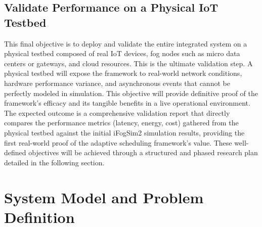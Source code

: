 \documentclass[conference]{IEEEtran}
\begin{document}
	
	\subsection{Validate Performance on a Physical IoT Testbed}
	This final objective is to deploy and validate the entire integrated system on a physical testbed composed of real IoT devices, fog nodes such as micro data centers or gateways, and cloud resources.
	This is the ultimate validation step. A physical testbed will expose the framework to real-world network conditions, hardware performance variance, and asynchronous events that cannot be perfectly modeled in simulation. This objective will provide definitive proof of the framework's efficacy and its tangible benefits in a live operational environment.
	The expected outcome is a comprehensive validation report that directly compares the performance metrics (latency, energy, cost) gathered from the physical testbed against the initial iFogSim2 simulation results, providing the first real-world proof of the adaptive scheduling framework's value.
	These well-defined objectives will be achieved through a structured and phased research plan detailed in the following section.
	\section{System Model and Problem Definition}
\end{document}
